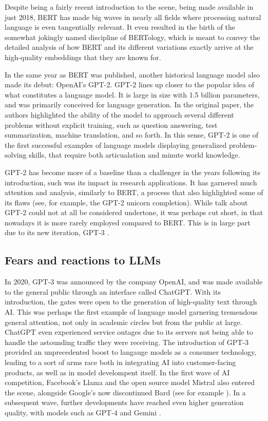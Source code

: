 Despite being a fairly recent introduction to the scene, being made available in just 2018, BERT has made big waves in nearly all fields where processing natural language is even tangentially relevant.
It even resulted in the birth of the somewhat jokingly named discipline of BERTology, which is meant to convey the detailed analysis of how BERT and its different variations exactly arrive at the high-quality embeddings that they are known for.

In the same year as BERT was published, another historical language model also made its debut: OpenAI's GPT-2. \citep{radford2019language}
GPT-2 lines up closer to the popular idea of what constitutes a language model. It is large in size with 1.5 billion parameters, and was primarily conceived for language generation.
In the original paper, the authors highlighted the ability of the model to approach several different problems without explicit training, such as question answering, test summarization, machine translation, and so forth.
In this sense, GPT-2 is one of the first successful examples of language models displaying generalized problem-solving skills, that require both articualation and minute world knowledge.

GPT-2 has become more of a baseline than a challenger in the years following its introduction, such was its impact in research applications. It has garnered much attention and analysis, similarly to BERT, a process that also highlighted some of its flaws (see, for example, the GPT-2 unicorn completion). While talk about GPT-2 could not at all be considered undertone, it was perhaps cut short, in that nowadays it is more rarely employed compared to BERT. This is in large part due to its new iteration, GPT-3 \citep{brown2020language}.

\subsection{Fears and reactions to LLMs}

In 2020, GPT-3 was announced by the company OpenAI, and was made available to the general public through an interface called ChatGPT. With its introduction, the gates were open to the generation of high-quality text through AI.
This was perhaps the first example of language model garnering tremendous general attention, not only in academic circles but from the public at large. ChatGPT even experienced service outages due to its servers not being able to handle the astounding traffic they were receiving.
The introduction of GPT-3 provided an unprecedented boost to langauge models as a consumer technology, leading to a sort of arms race both in integrating AI into customer-facing products, as well as in model develompent itself.
In the first wave of AI competition, Facebook's Llama \citep{touvron2023llama} and the open source model Mistral \citep{jiang2023mistral} also entered the scene, alongside Google's now discontinued Bard (see for example \citealp{fowler2023bard}). In a subsequent wave, further developments have reached even higher generation quality, with models such as GPT-4 \citep{openai2024gpt4technicalreport} and Gemini \citep{geminiteam2024geminifamilyhighlycapable}.

